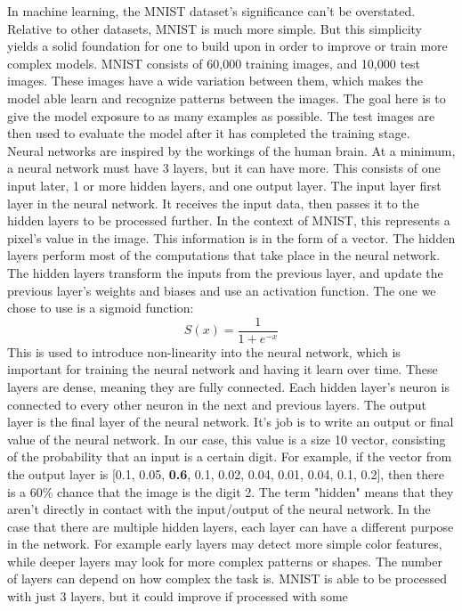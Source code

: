 \documentclass[12pt, twocolumn]{report}
\begin{document}
In machine learning, the MNIST dataset's significance can't be overstated.
Relative to other datasets, MNIST is much more simple. But this simplicity yields a solid foundation for one to build upon in order
to improve or train more complex models.
MNIST consists of 60,000 training images, and 10,000 test images.
These images have a wide variation between them, which makes the model able learn and recognize patterns between the images. The goal here
is to give the model exposure to as many examples as possible. The test images are then used to evaluate the model after it has
completed the training stage.
\\




Neural networks are inspired by the workings of the human brain. At a minimum, a neural network must have 3 layers, but it can have more.
This consists of one input later, 1 or more hidden layers, and one output layer. The input layer first layer in the neural network. It receives the input data,
then passes it to the hidden layers to be processed further. In the context of MNIST, this represents a pixel's value
in the image. This information is in the form of a vector. The hidden layers perform most of the computations that take place in the neural network.
The hidden layers transform the inputs from the previous layer, and update the previous layer's weights and biases and use an activation function. The one
we chose to use is a sigmoid function:
\[
S(x) = \frac{1}{1+e^{-x}}
\]
This is used to introduce non-linearity into the neural network, which is important for training
the neural network and having it learn over time. These layers are dense, meaning they are fully connected. Each hidden layer's neuron is connected
to every other neuron in the next and previous layers. The output layer is the final layer of the neural network. It's job is to write an output or final value of
the neural network. In our case, this value is a size 10 vector, consisting of the probability that an input is a certain digit. For example, if
the vector from the output layer is [0.1, 0.05, \textbf{0.6}, 0.1, 0.02, 0.04, 0.01, 0.04, 0.1, 0.2], then there is a 60\% chance that the image is
the digit 2. The term "hidden" means that they aren't directly in contact with the input/output of the neural network. In the case that there are multiple hidden layers,
each layer can have a different purpose in the network. For example early layers may detect more simple color features, while deeper layers may look for more complex patterns
or shapes. The number of layers can depend on how complex the task is. MNIST is able to be processed with just 3 layers, but it could improve if processed with some
\end{document}
